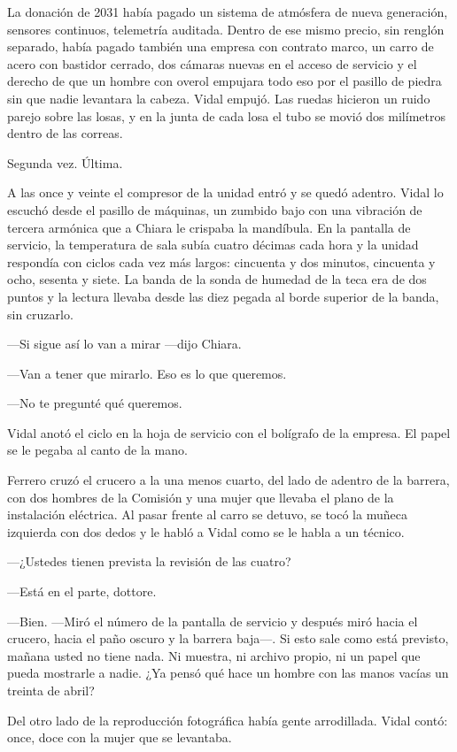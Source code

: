 La donación de 2031 había pagado un sistema de atmósfera de nueva generación, sensores continuos, telemetría auditada. Dentro de ese mismo precio, sin renglón separado, había pagado también una empresa con contrato marco, un carro de acero con bastidor cerrado, dos cámaras nuevas en el acceso de servicio y el derecho de que un hombre con overol empujara todo eso por el pasillo de piedra sin que nadie levantara la cabeza. Vidal empujó. Las ruedas hicieron un ruido parejo sobre las losas, y en la junta de cada losa el tubo se movió dos milímetros dentro de las correas.

Segunda vez. Última.

A las once y veinte el compresor de la unidad entró y se quedó adentro. Vidal lo escuchó desde el pasillo de máquinas, un zumbido bajo con una vibración de tercera armónica que a Chiara le crispaba la mandíbula. En la pantalla de servicio, la temperatura de sala subía cuatro décimas cada hora y la unidad respondía con ciclos cada vez más largos: cincuenta y dos minutos, cincuenta y ocho, sesenta y siete. La banda de la sonda de humedad de la teca era de dos puntos y la lectura llevaba desde las diez pegada al borde superior de la banda, sin cruzarlo.

---Si sigue así lo van a mirar ---dijo Chiara.

---Van a tener que mirarlo. Eso es lo que queremos.

---No te pregunté qué queremos.

Vidal anotó el ciclo en la hoja de servicio con el bolígrafo de la empresa. El papel se le pegaba al canto de la mano.

Ferrero cruzó el crucero a la una menos cuarto, del lado de adentro de la barrera, con dos hombres de la Comisión y una mujer que llevaba el plano de la instalación eléctrica. Al pasar frente al carro se detuvo, se tocó la muñeca izquierda con dos dedos y le habló a Vidal como se le habla a un técnico.

---¿Ustedes tienen prevista la revisión de las cuatro?

---Está en el parte, dottore.

---Bien. ---Miró el número de la pantalla de servicio y después miró hacia el crucero, hacia el paño oscuro y la barrera baja---. Si esto sale como está previsto, mañana usted no tiene nada. Ni muestra, ni archivo propio, ni un papel que pueda mostrarle a nadie. ¿Ya pensó qué hace un hombre con las manos vacías un treinta de abril?

Del otro lado de la reproducción fotográfica había gente arrodillada. Vidal contó: once, doce con la mujer que se levantaba.

